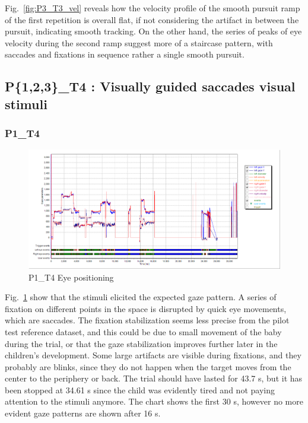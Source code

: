 Fig.~\ref{fig:P3_T3_vel} reveals how the velocity profile of the smooth pursuit ramp of the first repetition is overall flat, if not considering the artifact in between the pursuit, indicating smooth tracking. On the other hand, the series of peaks of eye velocity during the second ramp suggest more of a staircase pattern, with saccades and fixations in sequence rather a single smooth pursuit.

\subsection{P\{1,2,3\}\_T4 : Visually guided saccades visual stimuli}
\label{sec:P123_T4}


\subsubsection{P1\_T4}
\label{sec:P1_T4}

\begin{figure}[h]
  \centering
  \includegraphics[width=.8\textwidth]{figures/graphs/P1_T4(saccades)_XY.png}
  \caption[P1\_T4 Eye positioning]{P1\_T4 Eye positioning}
  \label{fig:P1_T4_pos}
\end{figure}

Fig.~\ref{fig:P1_T4_pos} show that the stimuli elicited the expected gaze pattern. A series of fixation on different points in the space is disrupted by quick eye movements, which are saccades. The fixation stabilization seems less precise from the pilot test reference dataset, and this could be due to small movement of the baby during the trial, or that the gaze stabilization improves further later in the children’s development. Some large artifacts are visible during fixations, and they probably are blinks, since they do not happen when the target moves from the center to the periphery or back.
The trial should have lasted for 43.7 s, but it has been stopped at 34.61 s since the child was evidently tired and not paying attention to the stimuli anymore. The chart shows the first 30 s, however no more evident gaze patterns are shown after 16 s.

